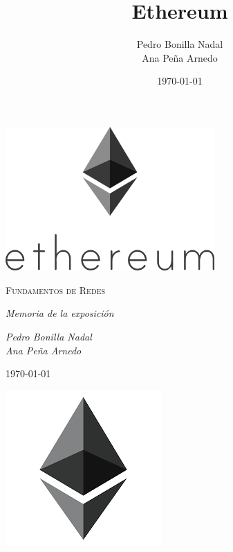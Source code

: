 \documentclass[11pt,a4paper]{article}
\title{Ethereum}
\author{Pedro Bonilla Nadal\\Ana Peña Arnedo}
\date{\today}
\begin{document}
\begin{titlepage}
  \centering
  
  \vspace{10cm}
  \includegraphics[width=0.6\textwidth]{images/portada.png}\par\vspace{1cm}
                  {\scshape\large Fundamentos de Redes \par} \vspace{1cm}
                  \vspace{0.4cm}
                         {\large\itshape Memoria de la exposición\\}
                         \vspace{0.6cm}
                                {\large\itshape  Pedro Bonilla Nadal\\Ana Peña Arnedo \par} \vspace{1.00cm}

                                \vfill
                                    {\large \today\par}

\end{titlepage}
\begin{center}
  \includegraphics[scale=.42]{images/logo.png}
\end{center}
\end{document}
